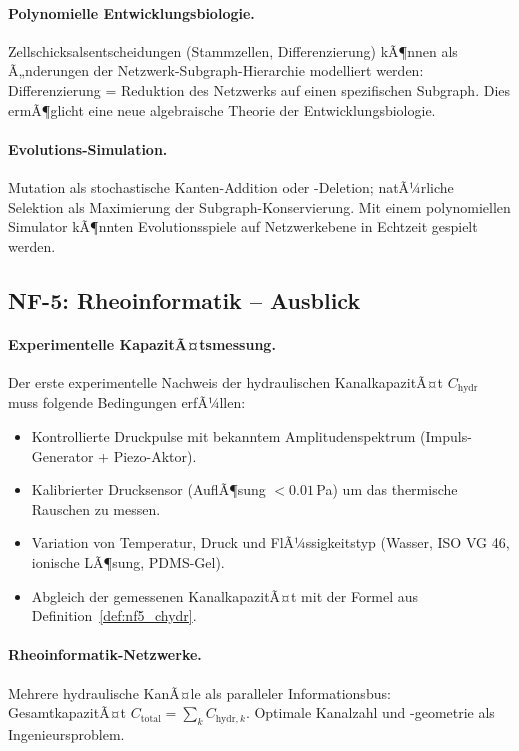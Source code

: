 ﻿\documentclass[a4paper,12pt]{scrreprt}
\theoremstyle{definition}
\begin{document}
\paragraph{Polynomielle Entwicklungsbiologie.}
Zellschicksalsentscheidungen (Stammzellen, Differenzierung) kÃ¶nnen als
Ã„nderungen der Netzwerk-Subgraph-Hierarchie modelliert werden:
Differenzierung = Reduktion des Netzwerks auf einen spezifischen
Subgraph. Dies ermÃ¶glicht eine neue algebraische Theorie der
Entwicklungsbiologie.

\paragraph{Evolutions-Simulation.}
Mutation als stochastische Kanten-Addition oder -Deletion; natÃ¼rliche
Selektion als Maximierung der Subgraph-Konservierung. Mit einem
polynomiellen Simulator kÃ¶nnten Evolutionsspiele
auf Netzwerkebene in Echtzeit gespielt werden.

\subsection*{NF-5: Rheoinformatik -- Ausblick}

\paragraph{Experimentelle KapazitÃ¤tsmessung.}
Der erste experimentelle Nachweis der hydraulischen KanalkapazitÃ¤t
$C_\mathrm{hydr}$ muss folgende Bedingungen erfÃ¼llen:
\begin{itemize}
  \item Kontrollierte Druckpulse mit bekanntem Amplitudenspektrum
    (Impuls-Generator + Piezo-Aktor).
  \item Kalibrierter Drucksensor (AuflÃ¶sung $< 0.01$\,Pa) um
    das thermische Rauschen zu messen.
  \item Variation von Temperatur, Druck und FlÃ¼ssigkeitstyp
    (Wasser, ISO VG 46, ionische LÃ¶sung, PDMS-Gel).
  \item Abgleich der gemessenen KanalkapazitÃ¤t mit der
    Formel aus Definition~\ref{def:nf5_chydr}.
\end{itemize}

\paragraph{Rheoinformatik-Netzwerke.}
Mehrere hydraulische KanÃ¤le als paralleler Informationsbus:
GesamtkapazitÃ¤t $C_\mathrm{total} = \sum_k C_{\mathrm{hydr},k}$.
Optimale Kanalzahl und -geometrie als Ingenieursproblem.
\end{document}
